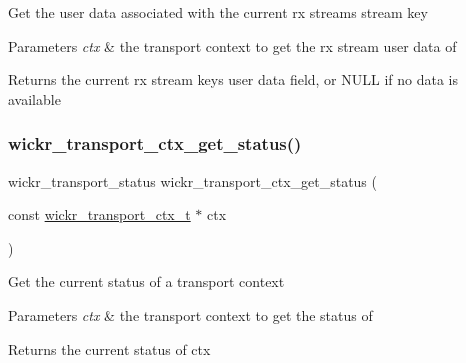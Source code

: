 Get the user data associated with the current rx stream\textquotesingle{}s stream key


\begin{DoxyParams}{Parameters}
{\em ctx} & the transport context to get the rx stream user data of \\
\hline
\end{DoxyParams}
\begin{DoxyReturn}{Returns}
the current rx stream key\textquotesingle{}s user data field, or N\+U\+LL if no data is available 
\end{DoxyReturn}
\mbox{\label{group__wickr__transport__ctx_ga3d3ffde9ec2f9f12ecb6999a048e2437}} 
\subsubsection{\texorpdfstring{wickr\+\_\+transport\+\_\+ctx\+\_\+get\+\_\+status()}{wickr\_transport\_ctx\_get\_status()}}
{\footnotesize\ttfamily wickr\+\_\+transport\+\_\+status wickr\+\_\+transport\+\_\+ctx\+\_\+get\+\_\+status (\begin{DoxyParamCaption}\item[{const \mbox{\hyperlink{structwickr__transport__ctx}{wickr\+\_\+transport\+\_\+ctx\+\_\+t}} $\ast$}]{ctx }\end{DoxyParamCaption})}

Get the current status of a transport context


\begin{DoxyParams}{Parameters}
{\em ctx} & the transport context to get the status of \\
\hline
\end{DoxyParams}
\begin{DoxyReturn}{Returns}
the current status of \textquotesingle{}ctx\textquotesingle{} 
\end{DoxyReturn}
\mbox{\label{group__wickr__transport__ctx_gaea14ff3de739f7bf4f85516fdefd1ea9}} 
